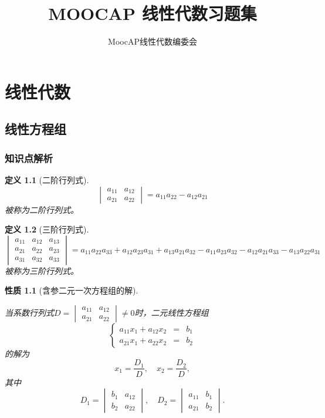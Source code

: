 \documentclass[a4paper]{book}
\newtheorem{prop}{性质}[chapter]
\newtheorem{Def}{定义}[chapter]
\newcommand{\sanhao}{\fontsize{12.75pt}{\baselineskip}\selectfont}
\begin{document}
\title{\Huge \bf MOOCAP 线性代数习题集} \normalfont
\date{}
\author{MoocAP线性代数编委会}
\maketitle
\tableofcontents

\noindent

\part{线性代数}

\chapter{线性方程组}

\section{知识点解析}

\begin{Def}[二阶行列式]
$$\begin{vmatrix} a_{11} & a_{12} \\ a_{21} & a_{22} \end{vmatrix} = a_{11}a_{22} - a_{12}a_{21}$$
被称为二阶行列式。
\end{Def}

\begin{Def}[三阶行列式]
$$\begin{vmatrix} a_{11} & a_{12} & a_{13} \\ a_{21} & a_{22} & a_{23} \\ a_{31} & a_{32} & a_{33} \end{vmatrix} = a_{11}a_{22}a_{33} + a_{12}a_{23}a_{31} + a_{13}a_{21}a_{32} - a_{11}a_{23}a_{32} - a_{12}a_{21}a_{33} - a_{13}a_{22}a_{31}$$
被称为三阶行列式。
\end{Def}

\begin{prop}[含参二元一次方程组的解]\

当系数行列式$D = \begin{vmatrix} a_{11} & a_{12} \\ a_{21} & a_{22} \end{vmatrix} \neq 0$时，二元线性方程组
$$\left\{ \begin{array}{rcl} a_{11}x_1 + a_{12}x_2 & = & b_1 \\ a_{21}x_1 + a_{22}x_2 & = & b_2 \end{array}\right.$$
的解为
$$x_1 = \frac{D_1}{D}, \quad x_2 = \frac{D_2}{D},$$
其中
$$D_1 = \begin{vmatrix} b_1 & a_{12} \\ b_2 & a_{22} \end{vmatrix}, \quad D_2 = \begin{vmatrix} a_{11} & b_1 \\ a_{21} & b_2 \end{vmatrix}.$$
\end{prop}
\end{document}
